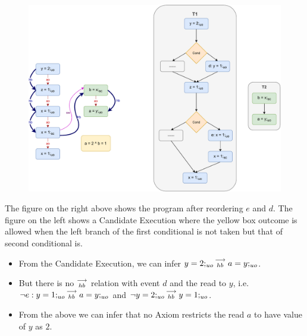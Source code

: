             \begin{figure}[H]
                \centering 
                \includegraphics[scale=0.7]{5.InstructionReordering/5.ValidReorderingProgram/CounterExamples3b(Conditionals).pdf}
                \caption{}
            \end{figure}
            The figure on the right above shows the program after reordering $e$ and $d$.  
            The figure on the left shows a Candidate Execution where the yellow box outcome is allowed when the left branch of the first conditional is not taken but that of second conditional is.
            \begin{itemize}
                \item From the Candidate Execution, we can infer $y=2;_{uo}\stackrel{\longrightarrow}{_{hb}}a=y;_{uo}$. 
                \item But there is no $\stackrel{\longrightarrow}{_{hb}}$ relation with event $d$ and the read to $y$, i.e. $\neg e:y=1;_{uo}\stackrel{\longrightarrow}{_{hb}}a=y;_{uo}$ and $\neg y=2;_{uo}\stackrel{\longrightarrow}{_{hb}}y=1;_{uo}$.
                \item From the above we can infer that no Axiom restricts the read $a$ to have value of $y$ as $2$.
            \end{itemize}

